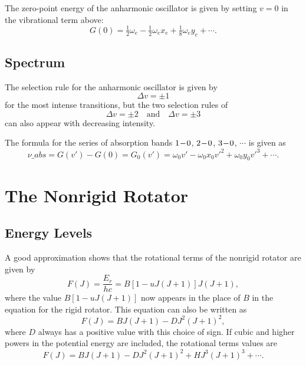 The zero-point energy of the anharmonic oscillator is given by setting $v = 0$ in the vibrational term above:
\begin{equation*}
    G(0) = \tfrac{1}{2}\omega_e - \tfrac{1}{2}\omega_ex_e + \tfrac{1}{8}\omega_ey_e + \dotsb.
\end{equation*}

\subsection{Spectrum}

The selection rule for the anharmonic oscillator is given by
\begin{equation*}
    \Delta{}v = \pm 1
\end{equation*}
for the most intense transitions, but the two selection rules of
\begin{equation*}
    \Delta{}v = \pm 2 \quad\text{and}\quad \Delta{}v = \pm 3
\end{equation*}
can also appear with decreasing intensity.

The formula for the series of absorption bands $1\!-\!0$, $2\!-\!0$, $3\!-\!0$, $\dotsb$ is given as
\begin{equation*}
    \nu\_{abs} = G(v') - G(0) = G_0(v') = \omega_0v' - \omega_0x_0v'^2 + \omega_0y_0v'^3 + \dotsb.
\end{equation*}

\section{The Nonrigid Rotator}
\label{s:the_nonrigid_rotator}

\subsection{Energy Levels}

A good approximation shows that the rotational terms of the nonrigid rotator are given by
\begin{equation*}
    F(J) = \frac{E_r}{hc} = B[1 - uJ(J + 1)]J(J + 1),
\end{equation*}
where the value $B[1 - uJ(J + 1)]$ now appears in the place of $B$ in the equation for the rigid rotator. This equation can also be written as
\begin{equation*}
    F(J) = BJ(J + 1) - DJ^2(J + 1)^2,
\end{equation*}
where $D$ always has a positive value with this choice of sign. If cubic and higher powers in the potential energy are included, the rotational terms values are
\begin{equation*}
    F(J) = BJ(J + 1) - DJ^2(J + 1)^2 + HJ^3(J + 1)^3 + \dotsb.
\end{equation*}

